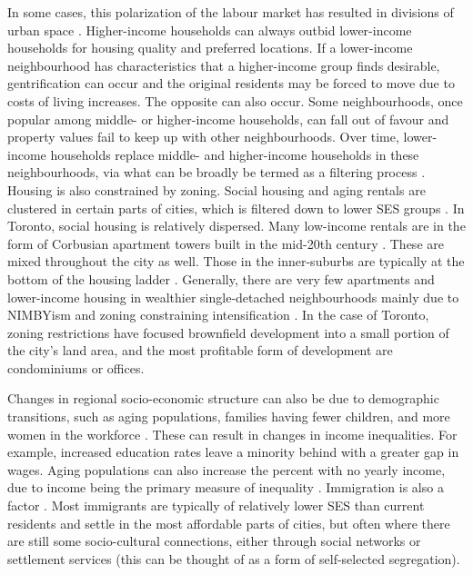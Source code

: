 In some cases, this polarization of the labour market has resulted in divisions of urban space \cite{walks_income_2013, walks_social_2001}. Higher-income households can always outbid lower-income households for housing quality and preferred locations. If a lower-income neighbourhood has characteristics that a higher-income group finds desirable, gentrification can occur and the original residents may be forced to move due to costs of living increases. The opposite can also occur. Some neighbourhoods, once popular among middle- or higher-income households, can fall out of favour and property values fail to keep up with other neighbourhoods. Over time, lower-income households replace middle- and higher-income households in these neighbourhoods, via what can be broadly be termed as a filtering process \cite{hulchanski_three_2010,ades_are_2012}. Housing is also constrained by zoning. Social housing and aging rentals are clustered in certain parts of cities, which is filtered down to lower SES groups \cite{hulchanski_three_2010}. In Toronto, social housing is relatively dispersed. Many low-income rentals are in the form of Corbusian apartment towers built in the mid-20th century \cite{august_gentrification_2018}. These are mixed throughout the city as well. Those in the inner-suburbs are typically at the bottom of the housing ladder \cite{hulchanski_three_2010,ehrenhalt_great_2012}. Generally, there are very few apartments and lower-income housing in wealthier single-detached neighbourhoods mainly due to NIMBYism and zoning constraining intensification \cite{scally_democracy_2015}. In the case of Toronto, zoning restrictions have focused brownfield development into a small portion of the city's land area, and the most profitable form of development are condominiums or offices. 

Changes in regional socio-economic structure can also be due to demographic transitions, such as aging populations, families having fewer children, and more women in the workforce \cite{bourne_changing_2001,bourne_are_1989}. These can result in changes in income inequalities. For example, increased education rates leave a minority behind with a greater gap in wages. Aging populations can also increase the percent with no yearly income, due to income being the primary measure of inequality \cite{bolton_growing_2012}. Immigration is also a factor \cite{bourne_changing_2001}. Most immigrants are typically of relatively lower SES than current residents and settle in the most affordable parts of cities, but often where there are still some socio-cultural connections, either through social networks or settlement services (this can be thought of as a form of self-selected segregation). 

